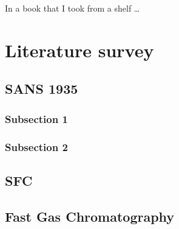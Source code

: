 
\begin{savequote}[45mm]
In a book that I took from a shelf \ldots
{}
\end{savequote}


\chapter{Literature survey} %

\label{Chapter3} %


\section{SANS 1935}

\subsection{Subsection 1}

\subsection{Subsection 2}

\section{SFC}

\section{Fast Gas Chromatography}
